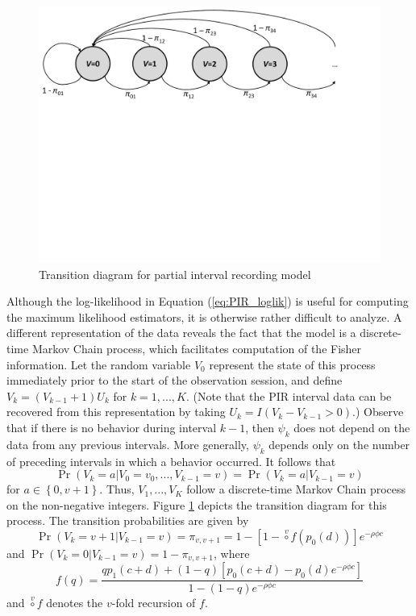 \documentclass[man, noextraspace, floatsintext]{apa6}\usepackage[]{graphicx}\usepackage[]{color}
\begin{document}
\begin{figure}[tbp]
\centering
\includegraphics[clip=true, trim= 0 340 70 00, width=0.9\linewidth]{ppt/PIR_transitions.pdf}
\caption{Transition diagram for partial interval recording model}
\label{fig:PIR_transitions}
\end{figure}  

Although the log-likelihood in Equation (\ref{eq:PIR_loglik}) is useful for computing the maximum likelihood estimators, it is otherwise rather difficult to analyze. 
A different representation of the data reveals the fact that the model is a discrete-time Markov Chain process, which facilitates computation of the Fisher information. 
Let the random variable $V_0$ represent the state of this process immediately prior to the start of the observation session, and define $V_k = \left(V_{k-1} + 1\right) U_k$ for $k=1,...,K$. 
(Note that the PIR interval data can be recovered from this representation by taking $U_k = I(V_k - V_{k-1} > 0)$.) 
Observe that if there is no behavior during interval $k-1$, then $\psi_k$ does not depend on the data from any previous intervals. 
More generally, $\psi_k$ depends only on the number of preceding intervals in which a behavior occurred.
It follows that 
\[
\Pr\left(V_k = a | V_0 = v_0,...,V_{k-1} = v\right) = \Pr\left(V_k = a | V_{k-1} = v\right) \]
for $a \in \left\{ 0, v + 1 \right\}$. 
Thus, $V_1,...,V_{K}$ follow a discrete-time Markov Chain process on the non-negative integers. 
Figure \ref{fig:PIR_transitions} depicts the transition diagram for this process.
The transition probabilities are given by 
\[ \Pr\left(V_k = v + 1 | V_{k-1} = v\right) = \pi_{v,v+1} = 1 - \left[1 - \stackrel{v}{\circ} f\left(p_0(d)\right)\right] e^{- \rho \phi c} \]
and $\Pr\left(V_k = 0 | V_{k-1} = v\right) = 1 - \pi_{v,v+1}$, 
where \[
f(q) = \frac{q p_1(c + d) + (1 - q)\left[p_0(c + d) - p_0(d) e^{- \rho \phi c}\right]}{1 - (1 - q)e^{- \rho \phi c}} \]
and $\stackrel{v}{\circ} f$ denotes the $v$-fold recursion of $f$.
\end{document}
